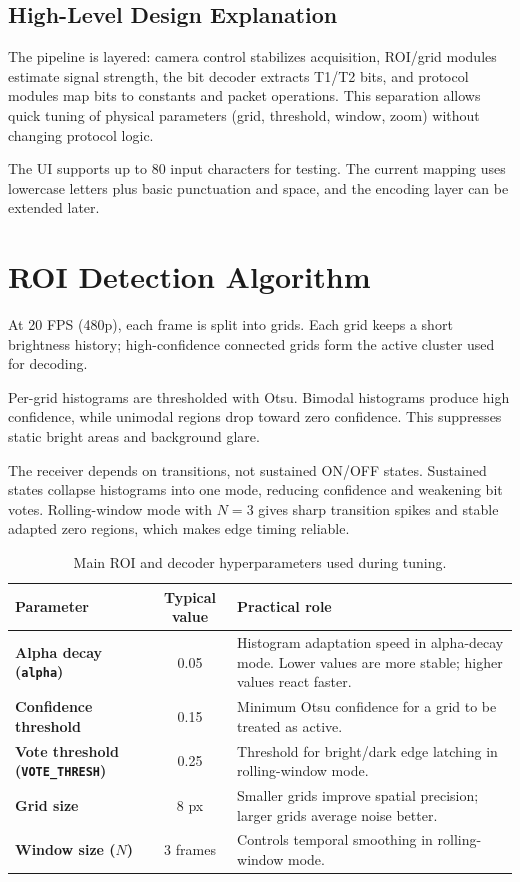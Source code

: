 \documentclass[10pt,a4paper]{article}
\begin{document}
\subsection{High-Level Design Explanation}
The pipeline is layered: camera control stabilizes acquisition, ROI/grid modules estimate signal strength, the bit decoder extracts T1/T2 bits, and protocol modules map bits to constants and packet operations. This separation allows quick tuning of physical parameters (grid, threshold, window, zoom) without changing protocol logic.

The UI supports up to 80 input characters for testing. The current mapping uses lowercase letters plus basic punctuation and space, and the encoding layer can be extended later.

\section{ROI Detection Algorithm}
At 20 FPS (480p), each frame is split into grids. Each grid keeps a short brightness history; high-confidence connected grids form the active cluster used for decoding.

Per-grid histograms are thresholded with Otsu. Bimodal histograms produce high confidence, while unimodal regions drop toward zero confidence. This suppresses static bright areas and background glare.

The receiver depends on transitions, not sustained ON/OFF states. Sustained states collapse histograms into one mode, reducing confidence and weakening bit votes. Rolling-window mode with \(N=3\) gives sharp transition spikes and stable adapted zero regions, which makes edge timing reliable.

\begin{table}[H]
\centering
\caption{Main ROI and decoder hyperparameters used during tuning.}
\begin{tabularx}{\linewidth}{>{\bfseries}l c X}
\toprule
Parameter & Typical value & Practical role \\
\midrule
Alpha decay (\texttt{alpha}) & 0.05 & Histogram adaptation speed in alpha-decay mode. Lower values are more stable; higher values react faster. \\
Confidence threshold & 0.15 & Minimum Otsu confidence for a grid to be treated as active. \\
Vote threshold (\texttt{VOTE\_THRESH}) & 0.25 & Threshold for bright/dark edge latching in rolling-window mode. \\
Grid size & 8 px & Smaller grids improve spatial precision; larger grids average noise better. \\
Window size (\(N\)) & 3 frames & Controls temporal smoothing in rolling-window mode. \\
\bottomrule
\end{tabularx}
\end{table}
\end{document}
